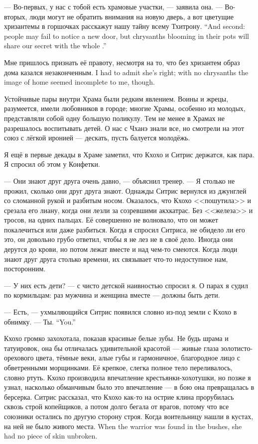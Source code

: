 --- Во-первых, у нас с тобой есть храмовые участки, --- заявила она.
{--- Во-вторых, люди могут не обратить внимания на новую дверь, а вот цветущие хризантемы в горшочках расскажут нашу тайну всему Тхитрону.}
{``And second: people may fail to notice a new door, but chrysanths blooming in their pots will share our secret with the whole \Tchitron.''}

{Мне пришлось признать её правоту, несмотря на то, что без хризантем образ дома казался незаконченным.}
{I had to admit she's right; with no chrysanths the image of home seemed incomplete to me, though.}

Устойчивые пары внутри Храма были редким явлением.
Воины и жрецы, разумеется, имели любовников в городе;
многие Храмы, особенно из молодых, представляли собой одну большую поликулу.
Тем не менее в Храмах не разрешалось воспитывать детей.
О нас с Чханэ знали все, но смотрели на этот союз с лёгкой иронией --- дескать, пусть балуется молодёжь.

Я ещё в первые декады в Храме заметил, что Кхохо и Ситрис держатся, как пара.
Я спросил об этом у Конфетки.

--- Они знают друг друга очень давно, --- объяснил тренер.
--- Я столько не прожил, сколько они друг друга знают.
Однажды Ситрис вернулся из джунглей со сломанной рукой и разбитым носом.
Оказалось, что Кхохо <<пошутила>> и срезала его лиану, когда они лезли за созревшими акхкатрас.
Без <<железа>> и тросов, на одних пальцах.
Её совершенно не волновало, что он может покалечиться или даже разбиться.
Когда я спросил Ситриса, не обидело ли его это, он довольно грубо ответил, чтобы я не лез не в своё дело.
Иногда они дерутся до крови, но потом лежат вместе и над чем-то смеются.
Когда люди знают друг друга столько времени, их связывает что-то недоступное нам, посторонним.

--- У них есть дети? --- с чисто детской наивностью спросил я.
О парах я судил по кормильцам: раз мужчина и женщина вместе --- должны быть дети.

--- Есть, --- ухмыляющийся Ситрис появился словно из-под земли с Кхохо в обнимку.
{--- Ты.}
{``You.''}

Кхохо громко захохотала, показав красивые белые зубы.
Не будь шрама и татуировок, она бы отличалась удивительной красотой --- живые глаза золотисто-орехового цвета, тёмные веки, алые губы и гармоничное, благородное лицо с обветренными морщинками.
Её крепкое, слегка полное тело переливалось, словно ртуть.
Кхохо производила впечатление крестьянки-хохотушки, но позже я узнал, насколько обманчивым было это впечатление --- в бою она превращалась в берсерка.
Ситрис рассказал, что Кхохо как-то на острие клина прорубилась сквозь строй копейщиков, а потом долго бегала от врагов, потому что все союзники остались по другую сторону строя.
{Когда воительницу нашли в кустах, на ней не было живого места.}
{When the warrior was found in the bushes, she had no piece of skin unbroken.}

